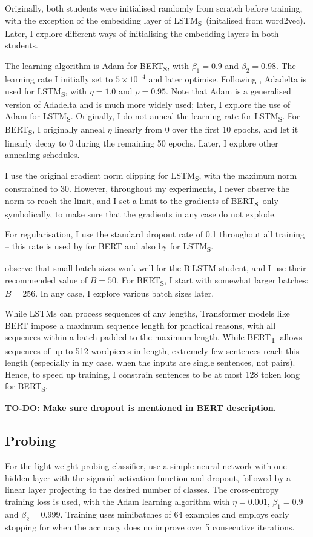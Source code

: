\documentclass[bsc,frontabs,twoside,singlespacing,parskip,deptreport]{infthesis}
\def\BERTT{BERT\textsubscript{T}}
\def\BERTS{BERT\textsubscript{S}}
\def\LSTMS{LSTM\textsubscript{S}}
\begin{document}
{{{      Originally, both students were initialised randomly from scratch before training, with the exception of the embedding layer of \LSTMS~(initalised from word2vec). Later, I explore different ways of initialising the embedding layers in both students.

      The learning algorithm is Adam for \BERTS, with $\beta_1=0.9$ and $\beta_2=0.98$. The learning rate I initially set to $5\times10^{-4}$ and later optimise.
      Following \citeauthor{Tang_2019b}, Adadelta \citep{Zeiler_2012} is used for \LSTMS, with $\eta=1.0$ and $\rho=0.95$.
      Note that Adam is a generalised version of Adadelta and is much more widely used; later, I explore the use of Adam for \LSTMS. Originally, I do not anneal the learning rate for \LSTMS. For \BERTS, I originally anneal $\eta$ linearly from 0 over the first 10 epochs, and let it linearly decay to 0 during the remaining 50 epochs. Later, I explore other annealing schedules.

      I use the original gradient norm clipping for \LSTMS, with the maximum norm constrained to 30. However, throughout my experiments, I never observe the norm to reach the limit, and I set a limit to the gradients of \BERTS~only symbolically, to make sure that the gradients in any case do not explode.

      For regularisation, I use the standard dropout rate of 0.1 throughout all training -- this rate is used by \citet{Devlin_2018} for BERT and also by \citeauthor{Tang_2019b} for \LSTMS.

      \citeauthor{Tang_2019b} observe that small batch sizes work well for the BiLSTM student, and I use their recommended value of $B=50$. For \BERTS, I start with somewhat larger batches: $B=256$. In any case, I explore various batch sizes later.

      While LSTMs can process sequences of any lengths, Transformer models like BERT impose a maximum sequence length for practical reasons, with all sequences within a batch padded to the maximum length. While \BERTT~allows sequences of up to 512 wordpieces in length, extremely few sentences reach this length (especially in my case, when the inputs are single sentences, not pairs). Hence, to speed up training, I constrain sentences to be at most 128 token long for \BERTS.

      \textbf{TO-DO: Make sure dropout is mentioned in BERT description.}
    }

    \subsection{Probing}{
      For the light-weight probing classifier, \citet{Conneau_2018} use a simple neural network with one hidden layer with the sigmoid activation function and dropout, followed by a linear layer projecting to the desired number of classes. The cross-entropy training loss is used, with the Adam learning algorithm with $\eta=0.001$, $\beta_1=0.9$ and $\beta_2=0.999$. Training uses minibatches of 64 examples and employs early stopping for when the accuracy does no improve over 5 consecutive iterations.

}}}
\end{document}
